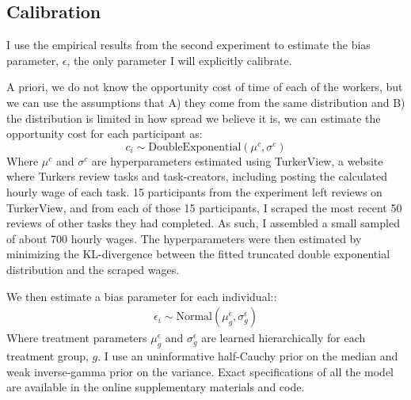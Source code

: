 \documentclass[a4paper,12pt]{article}
\begin{document}
\subsection{ Calibration }

I use the empirical results from the second experiment to estimate the bias parameter, $\epsilon$, the only parameter I will explicitly calibrate.

A priori, we do not know the opportunity cost of time of each of the workers, but we can use the assumptions that A) they come from the same distribution and B) the distribution is limited in how spread we believe it is, we can estimate the opportunity cost for each participant as:
$$
c_i \sim \text{DoubleExponential}(\mu^c, \sigma^c)
$$
Where $\mu^c$ and $\sigma^c$ are hyperparameters estimated using TurkerView, a website where Turkers review tasks and task-creators, including posting the calculated hourly wage of each task. 15 participants from the experiment left reviews on TurkerView, and from each of those 15 participants, I scraped the most recent 50 reviews of other tasks they had completed. As such, I assembled a small sampled of about 700 hourly wages. The hyperparameters were then estimated by minimizing the KL-divergence between the fitted truncated double exponential distribution and the scraped wages.

We then estimate a bias parameter for each individual::
\begin{align*}
  \epsilon_i \sim \text{Normal}(\mu^{\epsilon}_g, \sigma^{\epsilon}_g)
\end{align*}
Where treatment parameters $\mu^{\epsilon}_g$ and $\sigma^{\epsilon}_g$ are learned hierarchically for each treatment group, $g$. I use an uninformative half-Cauchy prior on the median and weak inverse-gamma prior on the variance. Exact specifications of all the model are available in the online supplementary materials and code.
\end{document}
